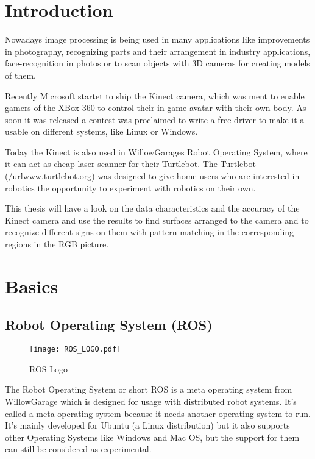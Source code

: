\chapter{Introduction}
\graphicspath{{./Introduction/img/}}

Nowadays image processing is being used in many applications like improvements in
photography, recognizing parts and their arrangement in industry applications, 
face-recognition in photos or to scan objects with 3D cameras for creating
models of them.

Recently Microsoft startet to ship the Kinect camera, which was ment to enable
gamers of the XBox-360 to control their in-game avatar with their own body.
As soon it was released a contest was proclaimed to write a free driver to make it a
usable on different systems, like Linux or Windows.

Today the Kinect is also used in WillowGarages Robot Operating System,
where it can act as cheap laser scanner for their Turtlebot. The Turtlebot 
(/url{www.turtlebot.org}) was designed to give home users who are interested in 
robotics the opportunity to experiment with robotics on their own.


This thesis will have a look on the data characteristics and the accuracy of the
Kinect camera and use the results to find surfaces arranged to the camera and to 
recognize different signs on them with pattern matching in the corresponding regions
in the RGB picture.

\chapter{Basics}

\section{Robot Operating System (ROS)}
  
\begin{figure}[h]
	\centering
	\texttt{[image: ROS\_LOGO.pdf]}
	\caption{ROS Logo}
\end{figure} 

The Robot Operating System or short ROS is a meta operating system from WillowGarage which is designed for usage with distributed 
robot systems. It's called a meta operating system because it needs another operating system to run. It's mainly developed for Ubuntu 
(a Linux distribution) but it also supports other Operating Systems like Windows and Mac OS, but the support for them can still be considered 
as experimental. 

